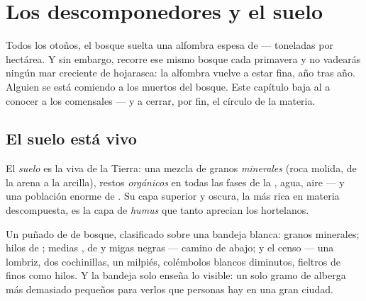 \chapter{Los descomponedores y el suelo}\label{ch:g6:decomposers-and-soil}

Todos los otoños, el bosque suelta una alfombra espesa de  ---
toneladas por hectárea. Y sin embargo, recorre ese mismo bosque cada
primavera y no vadearás ningún mar creciente de hojarasca: la alfombra
vuelve a estar fina, año tras año. Alguien se está comiendo a los
muertos del bosque. Este capítulo baja al  a conocer a los
comensales --- y a cerrar, por fin, el círculo de la materia.

\section{El suelo está vivo}

\begin{definition}[Suelo]\label{def:g6:decomposers-and-soil:soil}
El \emph{suelo} es la  viva de la Tierra: una mezcla
de granos \emph{minerales} (roca molida, de la arena a la arcilla),
restos \emph{orgánicos} en todas las fases de la , agua,
aire --- y una población enorme de . Su capa superior y
oscura, la más rica en materia descompuesta, es la capa de
\emph{humus} que tanto aprecian los hortelanos.
\end{definition}

\begin{example}\label{ex:g6:decomposers-and-soil:handful}
Un puñado de  de bosque, clasificado sobre una bandeja blanca:
granos minerales; hilos de ; medias ,  de  y
migas negras ---  camino de abajo; y el censo --- una
lombriz, dos cochinillas, un milpiés, colémbolos blancos diminutos,
fieltros de  finos como hilos. Y la bandeja solo enseña lo
visible: un solo gramo de  alberga más  demasiado
pequeños para verlos que personas hay en una gran ciudad.
\end{example}

